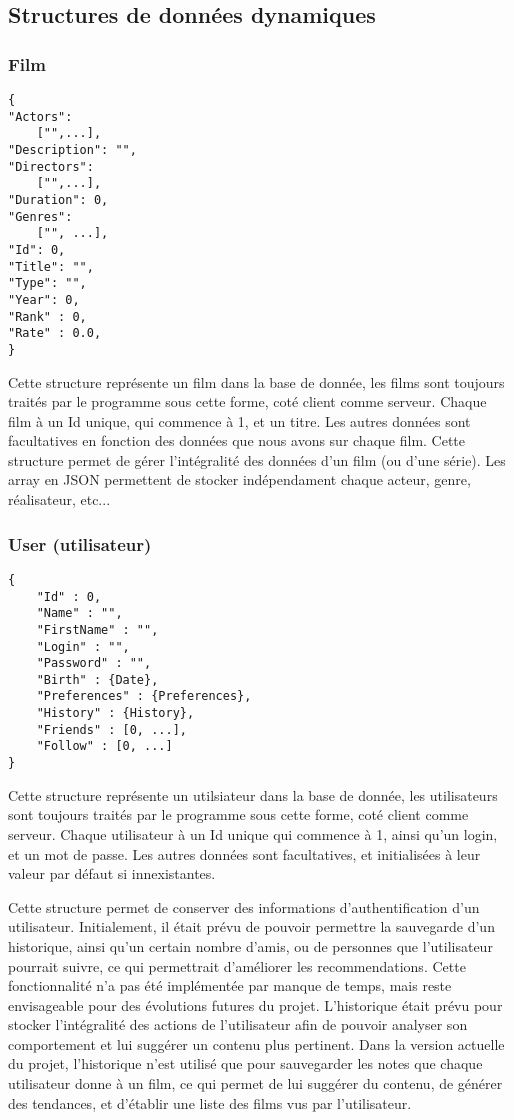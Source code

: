 % 
\subsection{Structures de données dynamiques}
\subsubsection{Film}
\begin{lstlisting}
{
"Actors":
	["",...],
"Description": "",
"Directors":
	["",...],
"Duration": 0,
"Genres":
	["", ...],
"Id": 0,
"Title": "",
"Type": "",
"Year": 0,
"Rank" : 0,
"Rate" : 0.0,
}
\end{lstlisting}
Cette structure représente un film dans la base de donnée, les films sont toujours traités par le programme sous cette forme, coté client comme serveur.
Chaque film à un Id unique, qui commence à 1, et un titre. Les autres données sont facultatives en fonction des données que nous avons sur chaque film.
Cette structure permet de gérer l'intégralité des données d'un film (ou d'une série).
Les array en JSON permettent de stocker indépendament chaque acteur, genre, réalisateur, etc...
\subsubsection{User (utilisateur)}
\begin{lstlisting}
{
	"Id" : 0,
	"Name" : "",
	"FirstName" : "",
	"Login" : "",
	"Password" : "",
	"Birth" : {Date},
	"Preferences" : {Preferences},
	"History" : {History},
	"Friends" : [0, ...],
	"Follow" : [0, ...]
}
\end{lstlisting}

Cette structure représente un utilsiateur dans la base de donnée, les utilisateurs sont toujours traités par le programme sous cette forme, coté client comme serveur.
Chaque utilisateur à un Id unique qui commence à 1, ainsi qu'un login, et un mot de passe.
Les autres données sont facultatives, et initialisées à leur valeur par défaut si innexistantes.
\par
Cette structure permet de conserver des informations d'authentification d'un utilisateur.
Initialement, il était prévu de pouvoir permettre la sauvegarde d'un historique, ainsi qu'un certain nombre d'amis, ou de personnes que l'utilisateur pourrait suivre, ce qui permettrait d'améliorer les recommendations.
Cette fonctionnalité n'a pas été implémentée par manque de temps, mais reste envisageable pour des évolutions futures du projet.
L'historique était prévu pour stocker l'intégralité des actions de l'utilisateur afin de pouvoir analyser son comportement et lui suggérer un contenu plus pertinent.
Dans la version actuelle du projet, l'historique n'est utilisé que pour sauvegarder les notes que chaque utilisateur donne à un film, ce qui permet de lui suggérer du contenu, de générer des tendances, et d'établir une liste des films vus par l'utilisateur.


